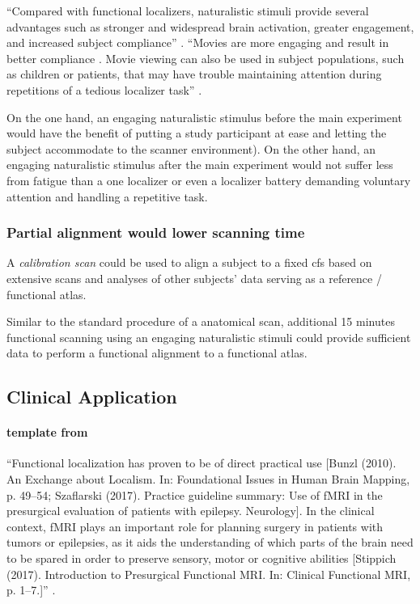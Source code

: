 ``Compared with functional localizers, naturalistic stimuli provide several
advantages such as stronger and widespread brain activation, greater engagement,
and increased subject compliance'' \citep{jiahui2020predicting}.
%
``Movies are more engaging and result in better compliance
\citep{vanderwal2015inscapes}.
%
Movie viewing can also be used in subject populations, such as children
\citep{richardson2018development} or patients, that may have trouble maintaining
attention during repetitions of a tedious localizer task''
\citep{jiahui2020predicting}.

%
On the one hand, an engaging naturalistic stimulus before the main experiment
would have the benefit of putting a study participant at ease and letting the
subject accommodate to the scanner environment).
%
On the other hand, an engaging naturalistic stimulus after the main experiment
would not suffer less from fatigue than a one localizer or even a localizer
battery demanding voluntary attention and handling a repetitive task.


\subsubsection{Partial alignment would lower scanning time}
%
A \textit{calibration scan} could be used to align a subject to a fixed \ac{cfs}
based on extensive scans and analyses of other subjects' data serving as a
reference / functional atlas.

%
Similar to the standard procedure of a anatomical scan, additional 15 minutes
functional scanning using an engaging naturalistic stimuli  could provide
sufficient data to perform a functional alignment to a functional atlas.


\subsection{Clinical Application}


\paragraph{template from \citet{wegrzyn2018thought}}

``Functional localization has proven to be of direct practical use [Bunzl
(2010). An Exchange about Localism. In: Foundational Issues in Human Brain
Mapping, p. 49–54; Szaflarski (2017). Practice guideline summary: Use of fMRI in
the presurgical evaluation of patients with epilepsy. Neurology].
%
In the clinical context, fMRI plays an important role for planning surgery in
patients with tumors or epilepsies, as it aids the understanding of which parts
of the brain need to be spared in order to preserve sensory, motor or cognitive
abilities [Stippich (2017). Introduction to Presurgical Functional MRI. In:
Clinical Functional MRI, p. 1–7.]'' \citep{wegrzyn2018thought}.

